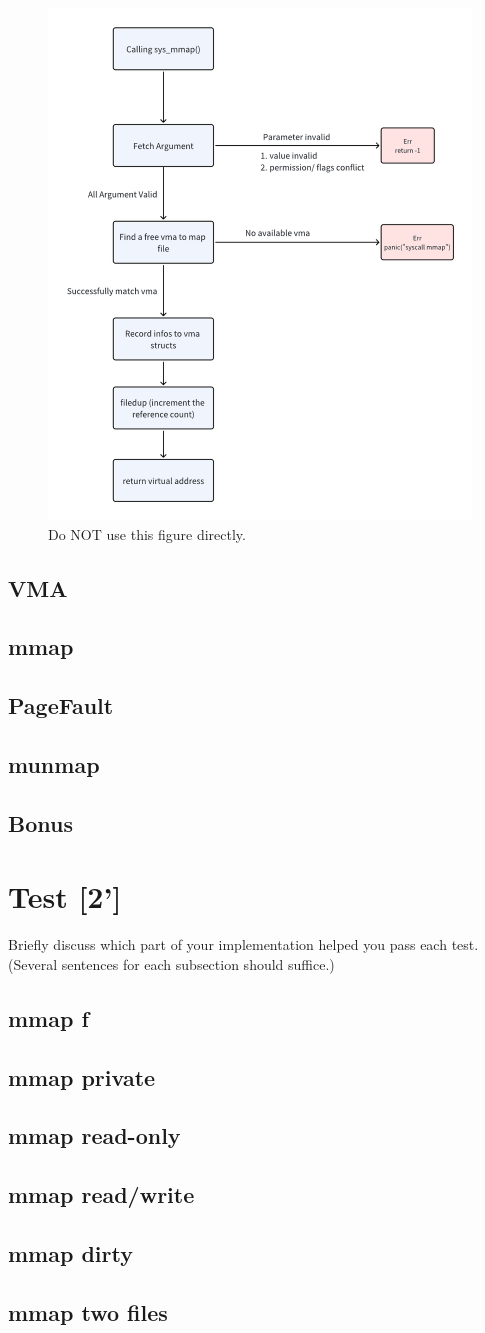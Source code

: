 \documentclass{article}
\begin{document}
\begin{figure}[h]
    \begin{center}
    \includegraphics[width=0.4\linewidth]{sample_progress.png}
    \caption{\label{fig:sample_progress} Do NOT use this figure directly.}
    \end{center}
\end{figure}

\subsection{VMA}
\subsection{mmap}
\subsection{PageFault}
\subsection{munmap}
\subsection{Bonus}

\section{Test [2']}

Briefly discuss which part of your implementation helped you pass each test. (Several sentences for each subsection should suffice.)

\subsection{mmap f}
\subsection{mmap private}
\subsection{mmap read-only}
\subsection{mmap read/write}
\subsection{mmap dirty}
\subsection{mmap two files}
\end{document}
